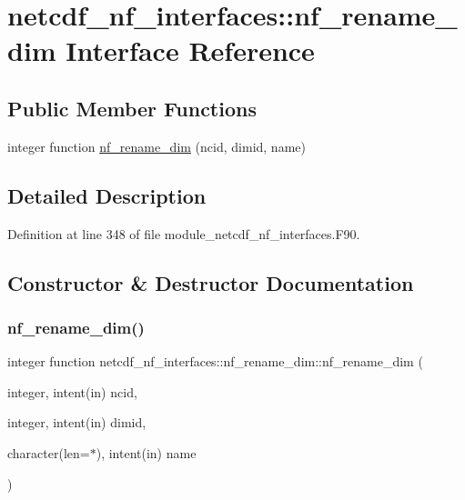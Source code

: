 \hypertarget{interfacenetcdf__nf__interfaces_1_1nf__rename__dim}{}\section{netcdf\+\_\+nf\+\_\+interfaces\+:\+:nf\+\_\+rename\+\_\+dim Interface Reference}
\label{interfacenetcdf__nf__interfaces_1_1nf__rename__dim}
\subsection*{Public Member Functions}
\begin{DoxyCompactItemize}
\item 
integer function \hyperlink{interfacenetcdf__nf__interfaces_1_1nf__rename__dim_aff19a00ba80510629433cfb4e4d922b5}{nf\+\_\+rename\+\_\+dim} (ncid, dimid, name)
\end{DoxyCompactItemize}


\subsection{Detailed Description}


Definition at line 348 of file module\+\_\+netcdf\+\_\+nf\+\_\+interfaces.\+F90.



\subsection{Constructor \& Destructor Documentation}
\mbox{\label{interfacenetcdf__nf__interfaces_1_1nf__rename__dim_aff19a00ba80510629433cfb4e4d922b5}} 
\subsubsection{\texorpdfstring{nf\+\_\+rename\+\_\+dim()}{nf\_rename\_dim()}}
{\footnotesize\ttfamily integer function netcdf\+\_\+nf\+\_\+interfaces\+::nf\+\_\+rename\+\_\+dim\+::nf\+\_\+rename\+\_\+dim (\begin{DoxyParamCaption}\item[{integer, intent(in)}]{ncid,  }\item[{integer, intent(in)}]{dimid,  }\item[{character(len=$\ast$), intent(in)}]{name }\end{DoxyParamCaption})}



